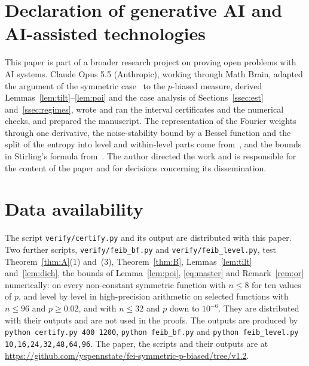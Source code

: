 \documentclass[11pt]{amsart}
\theoremstyle{remark}
\begin{document}
\section*{Declaration of generative AI and AI-assisted technologies}
This paper is part of a broader research project on proving open problems with AI systems. Claude Opus 5.5 (Anthropic), working through Math Brain, adapted the argument of the symmetric case~\cite{Shm26sym} to the $p$-biased measure, derived Lemmas~\ref{lem:tilt}--\ref{lem:poi} and the case analysis of Sections~\ref{ssec:est} and~\ref{ssec:regimes}, wrote and ran the interval certificates and the numerical checks, and prepared the manuscript. The representation of the Fourier weights through one derivative, the noise-stability bound by a Bessel function and the split of the entropy into level and within-level parts come from~\cite{Shm26sym}, and the bounds in Stirling's formula from~\cite{Rob55}. The author directed the work and is responsible for the content of the paper and for decisions concerning its dissemination.

\section*{Data availability}
The script \texttt{verify/certify.py} and its output are distributed with this paper. Two further scripts, \texttt{verify/feib\_bf.py} and \texttt{verify/feib\_level.py}, test Theorem~\ref{thm:A}(1) and~(3), Theorem~\ref{thm:B}, Lemmas~\ref{lem:tilt} and~\ref{lem:dich}, the bounds of Lemma~\ref{lem:poi}, \eqref{eq:master} and Remark~\ref{rem:or} numerically: on every non-constant symmetric function with $n \le 8$ for ten values of $p$, and level by level in high-precision arithmetic on selected functions with $n \le 96$ and $p \ge 0.02$, and with $n \le 32$ and $p$ down to $10^{-6}$. They are distributed with their outputs and are not used in the proofs. The outputs are produced by \texttt{python certify.py 400 1200}, \texttt{python feib\_bf.py} and \texttt{python feib\_level.py 10,16,24,32,48,64,96}. The paper, the scripts and their outputs are at \url{https://github.com/yspennstate/fei-symmetric-p-biased/tree/v1.2}.

\appendix
\end{document}
